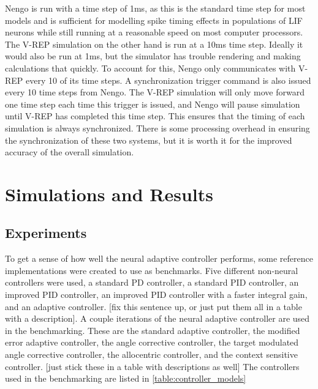 \documentclass[letterpaper,12pt,titlepage,oneside,final]{book}
\begin{document}
Nengo is run with a time step of 1ms, as this is the standard time step for most models and is sufficient for modelling spike timing effects in populations of LIF neurons while still running at a reasonable speed on most computer processors. 
The V-REP simulation on the other hand is run at a 10ms time step. 
Ideally it would also be run at 1ms, but the simulator has trouble rendering and making calculations that quickly. 
To account for this, Nengo only communicates with V-REP every 10 of its time steps. 
A synchronization trigger command is also issued every 10 time steps from Nengo. The V-REP simulation will only move forward one time step each time this trigger is issued, and Nengo will pause simulation until V-REP has completed this time step. 
This ensures that the timing of each simulation is always synchronized. 
There is some processing overhead in ensuring the synchronization of these two systems, but it is worth it for the improved accuracy of the overall simulation. 

\chapter{Simulations and Results} \label{chap:analysis}

\section{Experiments}


To get a sense of how well the neural adaptive controller performs, some reference implementations were created to use as benchmarks. 
Five different non-neural controllers were used, a standard PD controller, a standard PID controller, an improved PID controller, an improved PID controller with a faster integral gain, and an adaptive controller. [fix this sentence up, or just put them all in a table with a description].
A couple iterations of the neural adaptive controller are used in the benchmarking. 
These are the standard adaptive controller, the modified error adaptive controller, the angle corrective controller, the target modulated angle corrective controller, the allocentric controller, and the context sensitive controller. [just stick these in a table with descriptions as well] %
The controllers used in the benchmarking are listed in \autoref{table:controller_models}
\end{document}
